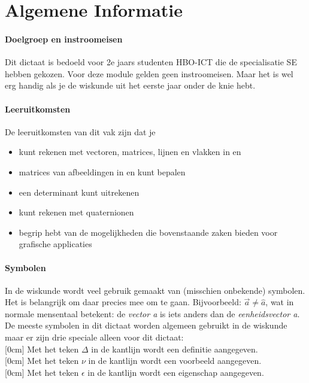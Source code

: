 \chapter{Algemene Informatie}
\label{chap:algemeneinformatie}

\subsubsection{Doelgroep en instroomeisen}
Dit dictaat is bedoeld voor 2e jaars studenten HBO-ICT die de specialisatie SE hebben gekozen. Voor deze module gelden geen instroomeisen. Maar het is wel erg handig als je de wiskunde uit het eerste jaar onder de knie hebt.

\subsubsection*{Leeruitkomsten}
De leeruitkomsten van dit vak zijn dat je
\begin{itemize}
        \setlength\itemsep{-1pt}
        \item kunt rekenen met vectoren, matrices, lijnen en vlakken  in \RT en \RD
        \item matrices van afbeeldingen in \RT en \RD kunt bepalen
        \item een determinant kunt uitrekenen
        \item kunt rekenen met quaternionen
        \item begrip hebt van de mogelijkheden die bovenstaande zaken bieden voor grafische applicaties
        \newline
    \end{itemize}

\subsubsection{Symbolen}
In de wiskunde wordt veel gebruik gemaakt van (misschien onbekende) symbolen. Het is belangrijk om daar precies mee om te gaan. Bijvoorbeeld: $ \vec{a} \ne \hat{a} $, wat in normale mensentaal betekent: de \textit{vector a} is iets anders dan de \textit{eenheidsvector a}. 
De meeste symbolen in dit dictaat worden algemeen gebruikt in de wiskunde maar er zijn drie speciale alleen voor dit dictaat:\\
[0cm]
Met het teken {\Large $ \Delta $ }in de kantlijn wordt een definitie aangegeven.\\
[0cm]
Met het teken {\LARGE $ \nu $ }  in de kantlijn wordt een voorbeeld aangegeven.\\
[0cm]
Met het teken {\LARGE $ \epsilon $ }  in de kantlijn wordt  een eigenschap aangegeven.\\

